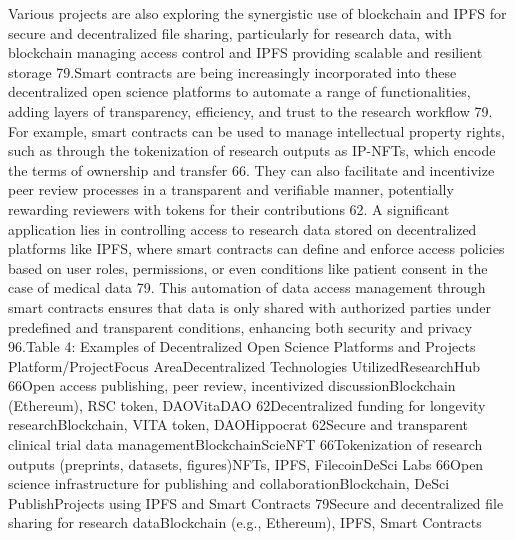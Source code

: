 \documentclass{article}
\begin{document}
Various projects are also exploring the synergistic use of blockchain and IPFS for secure and decentralized file sharing, particularly for research data, with blockchain managing access control and IPFS providing scalable and resilient storage 79.Smart contracts are being increasingly incorporated into these decentralized open science platforms to automate a range of functionalities, adding layers of transparency, efficiency, and trust to the research workflow 79. For example, smart contracts can be used to manage intellectual property rights, such as through the tokenization of research outputs as IP-NFTs, which encode the terms of ownership and transfer 66. They can also facilitate and incentivize peer review processes in a transparent and verifiable manner, potentially rewarding reviewers with tokens for their contributions 62. A significant application lies in controlling access to research data stored on decentralized platforms like IPFS, where smart contracts can define and enforce access policies based on user roles, permissions, or even conditions like patient consent in the case of medical data 79. This automation of data access management through smart contracts ensures that data is only shared with authorized parties under predefined and transparent conditions, enhancing both security and privacy 96.Table 4: Examples of Decentralized Open Science Platforms and Projects
Platform/ProjectFocus AreaDecentralized Technologies UtilizedResearchHub 66Open access publishing, peer review, incentivized discussionBlockchain (Ethereum), RSC token, DAOVitaDAO 62Decentralized funding for longevity researchBlockchain, VITA token, DAOHippocrat 62Secure and transparent clinical trial data managementBlockchainScieNFT 66Tokenization of research outputs (preprints, datasets, figures)NFTs, IPFS, FilecoinDeSci Labs 66Open science infrastructure for publishing and collaborationBlockchain, DeSci PublishProjects using IPFS and Smart Contracts 79Secure and decentralized file sharing for research dataBlockchain (e.g., Ethereum), IPFS, Smart Contracts
\end{document}
